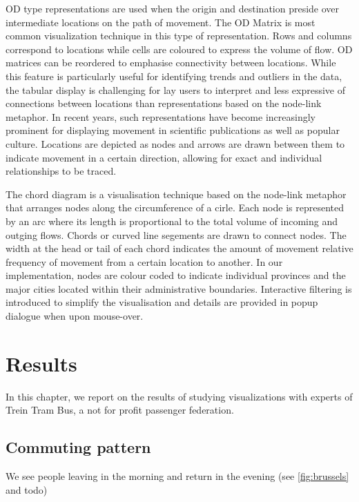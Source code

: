 \documentclass{sig-alternate}
\begin{document}
OD type representations are used when the origin and destination preside over intermediate locations on the path of movement. 
The OD Matrix is most common visualization technique in this type of representation. 
Rows and columns correspond to locations while cells are coloured to express the volume of flow.
OD matrices can be reordered to emphasise connectivity between locations.
While this feature is particularly useful for identifying trends and outliers in the data, the tabular display is challenging for lay users to interpret and less expressive of connections between locations than representations based on the node-link metaphor.
In recent years, such representations have become increasingly prominent for  displaying movement in scientific publications as well as popular culture.
Locations are depicted as nodes and arrows are drawn between them to indicate movement in a certain direction, allowing for exact and individual relationships to be traced.

The chord diagram is a visualisation technique based on the node-link metaphor that arranges nodes along the circumference of a cirle. 
Each node is represented by an arc where its length is proportional to the total volume of incoming and outging flows. 
Chords or curved line segements are drawn to connect nodes. 
The width at the head or tail of each chord indicates the amount of movement relative frequency of movement from a certain location to another. 
In our implementation, nodes are colour coded to indicate individual provinces and the major cities located within their administrative boundaries. 
Interactive filtering is introduced to simplify the visualisation and details are provided in popup dialogue when upon mouse-over.

\section{Results}
\label{sec:results}

In this chapter, we report on the results of studying visualizations with experts of Trein Tram Bus, a not for profit passenger federation.

\subsection{Commuting pattern}

We see people leaving in the morning and return in the evening (see \cref{fig:brussels} and todo)
\end{document}
